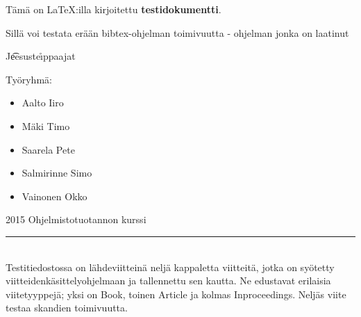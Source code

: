 \documentclass[a4paper,12pt]{article}
\begin{document}
Tämä on \LaTeX:illa kirjoitettu \textbf{testidokumentti}.

Sillä voi testata erään bibtex-ohjelman toimivuutta - ohjelman jonka on laatinut\\ 
\begin{center}{ 
{\huge J\t{ee}suste\r{\i}ppaajat}
\\
}\end{center}

 Työryhmä: 
 \begin{itemize}
    \item
       Aalto Iiro
    \item 
       Mäki Timo
    \item 
       Saarela Pete
    \item
       Salmirinne Simo
    \item
       Vainonen Okko
 \end{itemize}

 2015 Ohjelmistotuotannon kurssi\\[1cm]
\noindent\rule{14cm}{0.4pt}\\[1cm]
Testitiedostossa on lähdeviitteinä neljä kappaletta viitteitä, jotka on syötetty viitteidenkäsittelyohjelmaan ja tallennettu sen kautta. Ne edustavat erilaisia viitetyyppejä; yksi on Book\cite{BA04}, toinen Article\cite{W04} ja kolmas Inproceedings\cite{VPL11}. Neljäs viite\cite{TEST} testaa skandien toimivuutta.


{}

\end{document}
